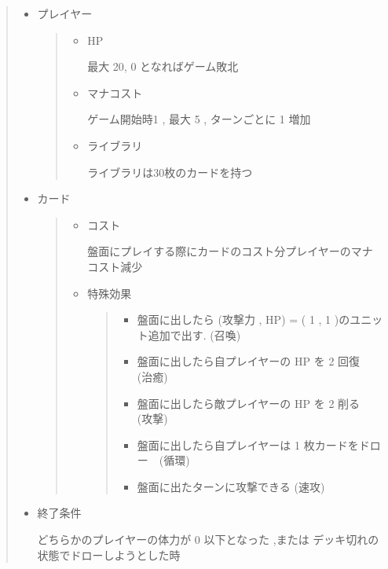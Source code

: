 \documentclass{jarticle}     %
\begin{document}
\begin{quote}
  \begin{itemize}
   \item プレイヤー
   \par
   \begin{quote}
    \begin{itemize}
     \item HP
     \par
     最大 20, 0 となればゲーム敗北
     \item マナコスト
     \par
     ゲーム開始時1 , 最大 5 , ターンごとに 1 増加
     \item ライブラリ
     \par
     ライブラリは30枚のカードを持つ
    \end{itemize}
   \end{quote}
   \item カード
   \begin{quote}
    \begin{itemize}
     \item コスト
     \par
     盤面にプレイする際にカードのコスト分プレイヤーのマナコスト減少
     \item 特殊効果
     \par
     \begin{quote}
      \begin{itemize}
       \item 盤面に出したら (攻撃力 , HP) = ( 1 , 1 )のユニット追加で出す. (召喚)
       \item 盤面に出したら自プレイヤーの HP を 2 回復　(治癒)
       \item 盤面に出したら敵プレイヤーの HP を 2 削る　(攻撃)
       \item 盤面に出したら自プレイヤーは 1 枚カードをドロー　(循環)
       \item 盤面に出たターンに攻撃できる (速攻)
      \end{itemize}
     \end{quote}
    \end{itemize}
   \end{quote}
   \item 終了条件
   \par
   どちらかのプレイヤーの体力が 0 以下となった ,または デッキ切れの状態でドローしようとした時

  \end{itemize}
 \end{quote}
\end{document}
